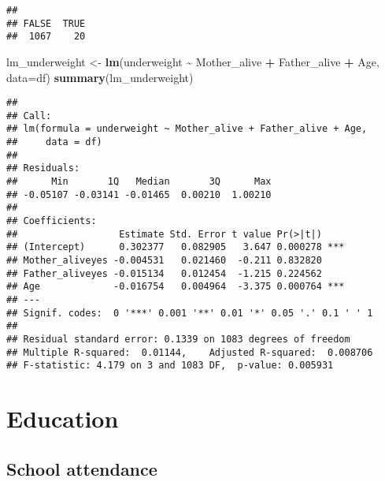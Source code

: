 \documentclass[
]{article}
\newenvironment{Shaded}{\begin{snugshade}}{\end{snugshade}}
\newcommand{\AttributeTok}[1]{\textcolor[rgb]{0.13,0.29,0.53}{#1}}
\newcommand{\FunctionTok}[1]{\textcolor[rgb]{0.13,0.29,0.53}{\textbf{#1}}}
\newcommand{\NormalTok}[1]{#1}
\newcommand{\OtherTok}[1]{\textcolor[rgb]{0.56,0.35,0.01}{#1}}
\newcommand{\SpecialCharTok}[1]{\textcolor[rgb]{0.81,0.36,0.00}{\textbf{#1}}}
\begin{document}
\begin{Shaded}
\end{Shaded}

\begin{verbatim}
## 
## FALSE  TRUE 
##  1067    20
\end{verbatim}

\begin{Shaded}
\begin{Highlighting}[]
\NormalTok{lm\_underweight }\OtherTok{\textless{}{-}} \FunctionTok{lm}\NormalTok{(underweight }\SpecialCharTok{\textasciitilde{}}\NormalTok{ Mother\_alive }\SpecialCharTok{+}\NormalTok{ Father\_alive }\SpecialCharTok{+}\NormalTok{ Age, }\AttributeTok{data=}\NormalTok{df)}
\FunctionTok{summary}\NormalTok{(lm\_underweight)}
\end{Highlighting}
\end{Shaded}

\begin{verbatim}
## 
## Call:
## lm(formula = underweight ~ Mother_alive + Father_alive + Age, 
##     data = df)
## 
## Residuals:
##      Min       1Q   Median       3Q      Max 
## -0.05107 -0.03141 -0.01465  0.00210  1.00210 
## 
## Coefficients:
##                  Estimate Std. Error t value Pr(>|t|)    
## (Intercept)      0.302377   0.082905   3.647 0.000278 ***
## Mother_aliveyes -0.004531   0.021460  -0.211 0.832820    
## Father_aliveyes -0.015134   0.012454  -1.215 0.224562    
## Age             -0.016754   0.004964  -3.375 0.000764 ***
## ---
## Signif. codes:  0 '***' 0.001 '**' 0.01 '*' 0.05 '.' 0.1 ' ' 1
## 
## Residual standard error: 0.1339 on 1083 degrees of freedom
## Multiple R-squared:  0.01144,    Adjusted R-squared:  0.008706 
## F-statistic: 4.179 on 3 and 1083 DF,  p-value: 0.005931
\end{verbatim}

\hypertarget{education}{%
\section{Education}\label{education}}

\hypertarget{school-attendance}{%
\subsection{School attendance}\label{school-attendance}}
\end{document}
